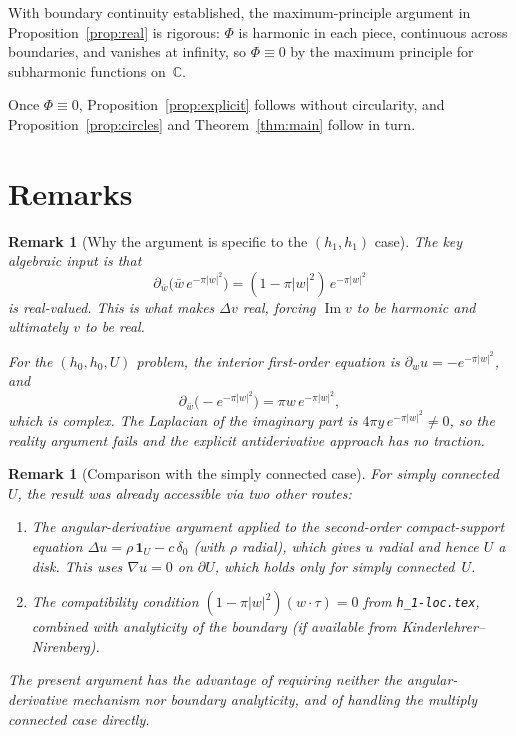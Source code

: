 \documentclass[11pt]{article}
\newtheorem{remark}[theorem]{Remark}
\newcommand{\C}{\mathbb C}
\newcommand{\1}{\mathbf 1}
\newcommand{\pw}{\partial_w}
\newcommand{\pwb}{\partial_{\bar w}}
\begin{document}
With boundary continuity established, the maximum-principle argument in
Proposition~\ref{prop:real} is rigorous: \(\Phi\) is harmonic in each piece, continuous
across boundaries, and vanishes at infinity, so \(\Phi\equiv 0\) by the maximum principle
for subharmonic functions on~\(\C\).

Once \(\Phi\equiv 0\), Proposition~\ref{prop:explicit} follows without circularity, and
Proposition~\ref{prop:circles} and Theorem~\ref{thm:main} follow in turn.

\section{Remarks}

\begin{remark}[Why the argument is specific to the \((h_1,h_1)\) case]
The key algebraic input is that
\[
\pwb\bigl(\bar w\,e^{-\pi|w|^2}\bigr)=(1-\pi|w|^2)\,e^{-\pi|w|^2}
\]
is \emph{real-valued}. This is what makes \(\Delta v\) real, forcing
\(\operatorname{Im}v\) to be harmonic and ultimately \(v\) to be real.

For the \((h_0,h_0,U)\) problem, the interior first-order equation is
\(\pw u=-e^{-\pi|w|^2}\), and
\[
\pwb\bigl(-e^{-\pi|w|^2}\bigr)=\pi w\,e^{-\pi|w|^2},
\]
which is \emph{complex}. The Laplacian of the imaginary part is
\(4\pi y\,e^{-\pi|w|^2}\ne 0\), so the reality argument fails and the explicit
antiderivative approach has no traction.
\end{remark}

\begin{remark}[Comparison with the simply connected case]
For simply connected~\(U\), the result was already accessible via two other routes:
\begin{enumerate}[label=\textnormal{(\roman*)}]
\item The angular-derivative argument applied to the second-order compact-support equation
\(\Delta u=\rho\,\1_U-c\,\delta_0\) (with \(\rho\) radial), which gives \(u\) radial
and hence \(U\) a disk. This uses \(\nabla u=0\) on \(\partial U\), which holds only
for simply connected~\(U\).
\item The compatibility condition
\((1-\pi|w|^2)(w\cdot\tau)=0\) from \texttt{h\_1-loc.tex}, combined with analyticity
of the boundary (if available from Kinderlehrer--Nirenberg).
\end{enumerate}
The present argument has the advantage of requiring neither the angular-derivative
mechanism nor boundary analyticity, and of handling the multiply connected case directly.
\end{remark}
\end{document}
